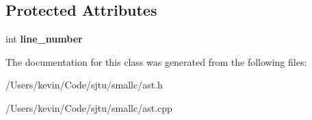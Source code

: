 \subsection*{Protected Attributes}
\begin{DoxyCompactItemize}
\item 
\mbox{\label{class_ast_node_a2416a4696f3355656a089c7531dec62e}} 
int {\bfseries line\+\_\+number}
\end{DoxyCompactItemize}


The documentation for this class was generated from the following files\+:\begin{DoxyCompactItemize}
\item 
/\+Users/kevin/\+Code/sjtu/smallc/ast.\+h\item 
/\+Users/kevin/\+Code/sjtu/smallc/ast.\+cpp\end{DoxyCompactItemize}
